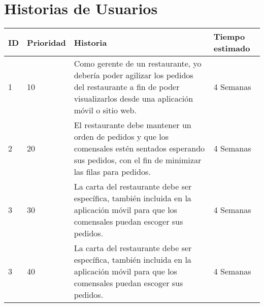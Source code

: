 \chapter{Historias de Usuarios}


\begin{table}[htbp]
	\begin{center}
		\begin{tabular}{| p{1.0cm}| p{2.0cm} | p{7.0cm}| p{4.0cm} |}
			\hline
			
			\textbf{ID} & \textbf {Prioridad} & \textbf{Historia} & \textbf{Tiempo estimado}
			
			\\\hline
			1 & 10 &
			
			Como gerente de un restaurante, yo debería poder agilizar los pedidos del restaurante a fin de poder visualizarlos desde una aplicación móvil o sitio web.
			
			& 4 Semanas
			
			\\\hline
			2 & 20 & 
			
			El restaurante debe mantener un orden de pedidos y que los comensales estén sentados esperando sus pedidos, con el fin de minimizar las filas para pedidos.
			
			& 4 Semanas
			
			\\\hline
			3 & 30	& 
			
			La carta del restaurante debe ser específica, también incluida en la aplicación móvil para que los comensales puedan escoger sus pedidos.
			
			& 4 Semanas
			
			\\\hline
			3 & 40	& 
			
			La carta del restaurante debe ser específica, también incluida en la aplicación móvil para que los comensales puedan escoger sus pedidos.
			
			& 4 Semanas \\\hline
		\end{tabular}
	\end{center}
\end{table}